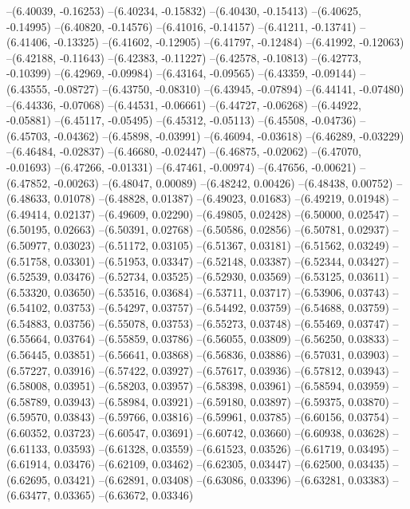 --(6.40039, -0.16253)
--(6.40234, -0.15832)
--(6.40430, -0.15413)
--(6.40625, -0.14995)
--(6.40820, -0.14576)
--(6.41016, -0.14157)
--(6.41211, -0.13741)
--(6.41406, -0.13325)
--(6.41602, -0.12905)
--(6.41797, -0.12484)
--(6.41992, -0.12063)
--(6.42188, -0.11643)
--(6.42383, -0.11227)
--(6.42578, -0.10813)
--(6.42773, -0.10399)
--(6.42969, -0.09984)
--(6.43164, -0.09565)
--(6.43359, -0.09144)
--(6.43555, -0.08727)
--(6.43750, -0.08310)
--(6.43945, -0.07894)
--(6.44141, -0.07480)
--(6.44336, -0.07068)
--(6.44531, -0.06661)
--(6.44727, -0.06268)
--(6.44922, -0.05881)
--(6.45117, -0.05495)
--(6.45312, -0.05113)
--(6.45508, -0.04736)
--(6.45703, -0.04362)
--(6.45898, -0.03991)
--(6.46094, -0.03618)
--(6.46289, -0.03229)
--(6.46484, -0.02837)
--(6.46680, -0.02447)
--(6.46875, -0.02062)
--(6.47070, -0.01693)
--(6.47266, -0.01331)
--(6.47461, -0.00974)
--(6.47656, -0.00621)
--(6.47852, -0.00263)
--(6.48047, 0.00089)
--(6.48242, 0.00426)
--(6.48438, 0.00752)
--(6.48633, 0.01078)
--(6.48828, 0.01387)
--(6.49023, 0.01683)
--(6.49219, 0.01948)
--(6.49414, 0.02137)
--(6.49609, 0.02290)
--(6.49805, 0.02428)
--(6.50000, 0.02547)
--(6.50195, 0.02663)
--(6.50391, 0.02768)
--(6.50586, 0.02856)
--(6.50781, 0.02937)
--(6.50977, 0.03023)
--(6.51172, 0.03105)
--(6.51367, 0.03181)
--(6.51562, 0.03249)
--(6.51758, 0.03301)
--(6.51953, 0.03347)
--(6.52148, 0.03387)
--(6.52344, 0.03427)
--(6.52539, 0.03476)
--(6.52734, 0.03525)
--(6.52930, 0.03569)
--(6.53125, 0.03611)
--(6.53320, 0.03650)
--(6.53516, 0.03684)
--(6.53711, 0.03717)
--(6.53906, 0.03743)
--(6.54102, 0.03753)
--(6.54297, 0.03757)
--(6.54492, 0.03759)
--(6.54688, 0.03759)
--(6.54883, 0.03756)
--(6.55078, 0.03753)
--(6.55273, 0.03748)
--(6.55469, 0.03747)
--(6.55664, 0.03764)
--(6.55859, 0.03786)
--(6.56055, 0.03809)
--(6.56250, 0.03833)
--(6.56445, 0.03851)
--(6.56641, 0.03868)
--(6.56836, 0.03886)
--(6.57031, 0.03903)
--(6.57227, 0.03916)
--(6.57422, 0.03927)
--(6.57617, 0.03936)
--(6.57812, 0.03943)
--(6.58008, 0.03951)
--(6.58203, 0.03957)
--(6.58398, 0.03961)
--(6.58594, 0.03959)
--(6.58789, 0.03943)
--(6.58984, 0.03921)
--(6.59180, 0.03897)
--(6.59375, 0.03870)
--(6.59570, 0.03843)
--(6.59766, 0.03816)
--(6.59961, 0.03785)
--(6.60156, 0.03754)
--(6.60352, 0.03723)
--(6.60547, 0.03691)
--(6.60742, 0.03660)
--(6.60938, 0.03628)
--(6.61133, 0.03593)
--(6.61328, 0.03559)
--(6.61523, 0.03526)
--(6.61719, 0.03495)
--(6.61914, 0.03476)
--(6.62109, 0.03462)
--(6.62305, 0.03447)
--(6.62500, 0.03435)
--(6.62695, 0.03421)
--(6.62891, 0.03408)
--(6.63086, 0.03396)
--(6.63281, 0.03383)
--(6.63477, 0.03365)
--(6.63672, 0.03346)
